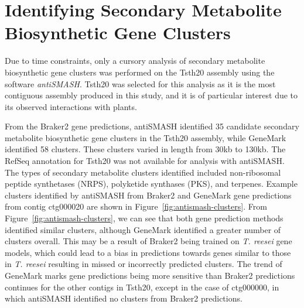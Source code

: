 \section{Identifying Secondary Metabolite Biosynthetic Gene Clusters}
\label{section:secondary-metabolites}

Due to time constraints, only a cursory analysis of secondary metabolite
biosynthetic gene clusters was performed on the Tsth20 assembly using the software \textit{antiSMASH}. Tsth20 was selected for this analysis as it is the most contiguous assembly produced in this study, and it is of particular interest due to its observed interactions with plants.

From the Braker2 gene predictions, antiSMASH identified 35 candidate secondary metabolite biosynthetic gene clusters in the Tsth20 assembly, while GeneMark identified 58 clusters. These clusters varied in length from 30kb to 130kb. The RefSeq annotation for Tsth20 was not available for analysis with antiSMASH. The types of secondary metabolite clusters identified included non-ribosomal peptide synthetases (NRPS), polyketide synthases (PKS), and terpenes. Example clusters identified by antiSMASH from Braker2 and GeneMark gene predictions from contig ctg000020 are shown in Figure~\ref{fig:antismash-clusters}. From Figure~\ref{fig:antismash-clusters}, we can see that both gene prediction methods identified similar clusters, although GeneMark identified a greater number of clusters overall. This may be a result of Braker2 being trained on \textit{T. reesei} gene models, which could lead to a bias in predictions towards genes similar to those in \textit{T. reesei} resulting in missed or incorrectly predicted clusters. The trend of GeneMark marks gene predictions being more sensitive than Braker2 predictions continues for the other contigs in Tsth20, except in the case of ctg000000, in which antiSMASH identified no clusters from Braker2 predictions.

